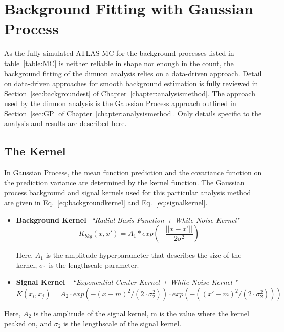 \section{Background Fitting with Gaussian Process}
\label{sec:GPresults}

As the fully simulated ATLAS MC for the background processes listed in table~\ref{table:MC} is neither reliable in shape nor enough in the count, the background fitting of the dimuon analysis relies on a data-driven approach. Detail on data-driven approaches for smooth background estimation is fully reviewed in Section~\ref{sec:backgroundest} of Chapter~\ref{chapter:analysismethod}. The approach used by the dimuon analysis is the Gaussian Process approach outlined in
Section~\ref{sec:GP} of Chapter~\ref{chapter:analysismethod}. Only details specific to the analysis and results are described here.

\subsection{The Kernel}
In Gaussian Process, the mean function prediction and the covariance function on the prediction variance are determined by the kernel function.
The Gaussian process background and signal kernels used for this particular analysis method are given in Eq.~\ref{eq:backgroundkernel} and Eq.~\ref{eq:signalkernel}. 

\begin{itemize}
    \item \textbf{Background Kernel} \textit{-``Radial Basis Function + White Noise Kernel"}
        \begin{equation}
                K_{bkg}(x, x') = A_{1} * exp(-\frac{||x-x'||}{2\sigma^{2}}) 
        \label{eq:backgroundkernel}
        \end{equation}

    Here, $A_{1}$ is the amplitude hyperparameter that describes the size of the kernel, $\sigma_{1}$ is the lengthscale parameter.
\item \textbf{Signal Kernel} \textit{- ``Exponential Center Kernel + White Noise Kernel "}
            \begin{equation}
            K(x_{i}, x_{j})=A_{2}\cdot exp(-(x-m)^{2}/(2\cdot\sigma_{2}^{2}))\cdot exp(-((x'-m)^{2}/(2\cdot\sigma_{2}^{2})))
            \label{eq:signalkernel}
            \end{equation}
\end{itemize}

    Here, $A_{2}$ is the amplitude of the signal kernel, m is the value where the kernel peaked on, and $\sigma_{2}$ is the lengthscale of the signal kernel. 

